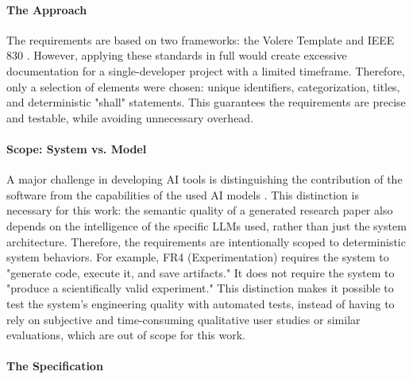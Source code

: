 \paragraph{The Approach} 
The requirements are based on two frameworks: the Volere Template \cite{Peng2025FromML} and IEEE 830 \cite{IEEE830}. 
However, applying these standards in full would create excessive documentation for a single-developer project with a limited timeframe. 
Therefore, only a selection of elements were chosen: unique identifiers, categorization, titles, and deterministic "shall" statements. 
This guarantees the requirements are precise and testable, while avoiding unnecessary overhead.

\paragraph{Scope: System vs. Model} 
A major challenge in developing AI tools is distinguishing the contribution of the software from the capabilities of the used AI models \cite{Peng2025FromML}.
This distinction is necessary for this work: the semantic quality of a generated research paper also depends on the intelligence of the specific LLMs used, rather than just the system architecture. 
Therefore, the requirements are intentionally scoped to deterministic system behaviors. 
For example, FR4 (Experimentation) requires the system to "generate code, execute it, and save artifacts." 
It does not require the system to "produce a scientifically valid experiment." 
This distinction makes it possible to test the system's engineering quality with automated tests, instead of having to rely on subjective and time-consuming qualitative user studies or similar evaluations, which are out of scope for this work.

\paragraph{The Specification}

